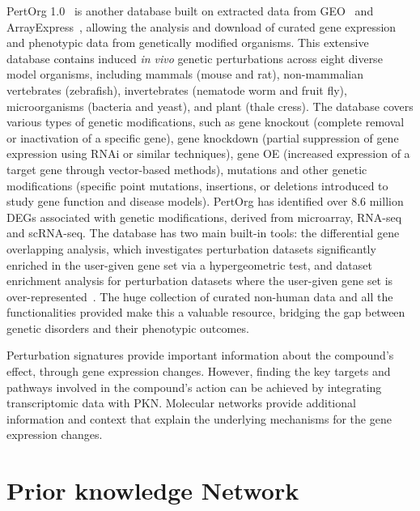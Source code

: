 PertOrg 1.0~\cite{RN85} is another database built on extracted data from \gls{GEO}~\cite{RN98} and ArrayExpress~\cite{RN122}, allowing the analysis and download of curated gene expression and phenotypic data from genetically modified organisms. 
This extensive database contains induced \textit{in vivo} genetic perturbations across eight diverse model organisms, including mammals (mouse and rat), non-mammalian vertebrates (zebrafish), invertebrates (nematode worm and fruit fly), microorganisms (bacteria and yeast), and plant (thale cress). The database covers various types of genetic modifications, such as gene knockout (complete removal or inactivation of a specific gene), gene knockdown (partial suppression of gene expression using \gls{RNA}i or similar techniques), gene \gls{OE} (increased expression of a target gene through vector-based methods), mutations and other genetic modifications (specific point mutations, insertions, or deletions introduced to study gene function and disease models). 
PertOrg has identified over 8.6 million \gls{DEGs} associated with genetic modifications, derived from microarray, \gls{RNA-seq} and \gls{scRNA-seq}. 
The database has two main built-in tools: the differential gene overlapping analysis, which investigates perturbation datasets significantly enriched in the user-given gene set via a hypergeometric test, and dataset enrichment analysis for perturbation datasets where the user-given gene set is over-represented~\cite{RN85}. 
The huge collection of curated non-human data and all the functionalities provided make this a valuable resource, bridging the gap between genetic disorders and their phenotypic outcomes.

Perturbation signatures provide important information about the compound's effect, through gene expression changes.
However, finding the key targets and pathways involved in the compound's action can be achieved by integrating transcriptomic data with \gls{PKN}. \gls{Molecular network}s provide additional information and context that explain the underlying mechanisms for the gene expression changes.

\section{Prior knowledge Network} %
\label{sec:PriorknowledgeNetwork}

